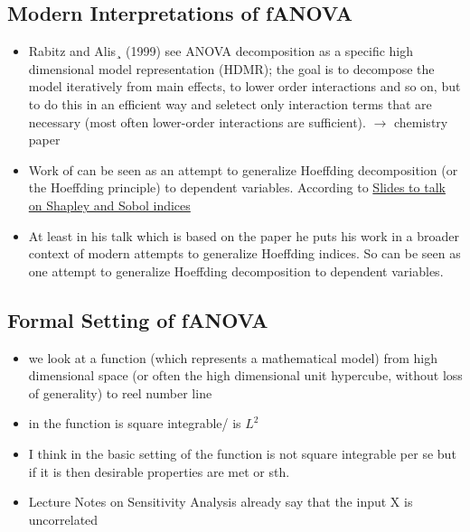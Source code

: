 \subsection*{Modern Interpretations of fANOVA}
\begin{itemize}
    \item Rabitz and Alis¸ (1999) see ANOVA decomposition as a specific high dimensional model representation (HDMR); the goal is to decompose the model iteratively from main effects, to lower order interactions and so on, but to do this in an efficient way and seletect only interaction terms that are necessary (most often lower-order interactions are sufficient). $\rightarrow$ chemistry paper
    \item Work of \cite{hooker_generalized_2007} can be seen as an attempt to generalize Hoeffding decomposition (or the Hoeffding principle) to dependent variables. According to \href{https://static1.squarespace.com/static/5f704d21e5464d602d153738/t/66ec27cadf4e8d42ed9018d0/1726752718798/20240918_SADiscord_MIL.pdf}{Slides to talk on Shapley and Sobol indices}
    \item At least in his talk which is based on the paper \cite{il_idrissi_hoeffding_2025} he puts his work in a broader context of modern attempts to generalize Hoeffding indices. So \cite{il_idrissi_hoeffding_2025} can be seen as one attempt to generalize Hoeffding decomposition to dependent variables.
\end{itemize}


\subsection*{Formal Setting of fANOVA}
\begin{itemize}
    \item we look at a function (which represents a mathematical model) from high dimensional space (or often the high dimensional unit hypercube, without loss of generality) to reel number line
    \item in \cite{hooker_discovering_2004,hooker_generalized_2007} the function is square integrable/ is $L^2$
    \item I think in the basic setting of \cite{sobol_global_2001} the function is not square integrable per se but if it is then desirable properties are met or sth.
    \item Lecture Notes on Sensitivity Analysis already say that the input X is uncorrelated
\end{itemize}

